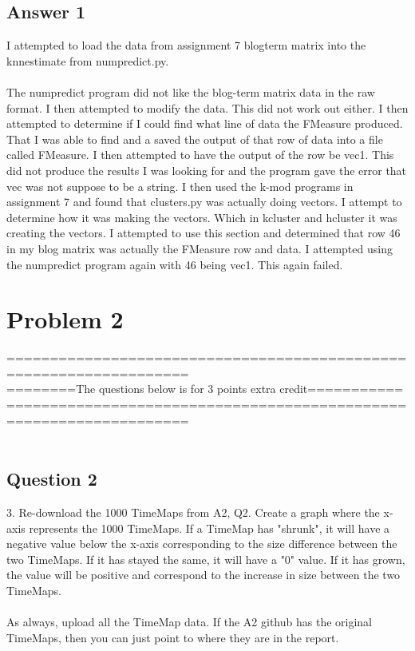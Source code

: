 \documentclass[10pt,letterpaper]{article}
\begin{document}
\subsection{Answer 1}

I attempted to load the data from assignment 7 blog\-term matrix into the knnestimate from numpredict.py.\\
\\
The numpredict program did not like the blog-term matrix data in the raw format.  I then attempted to modify the data.  This did not work out either.  I then attempted to determine if I could find what line of data the F\-Measure produced.  That I was able to find and a saved the output of that row of data into a file called F\-Measure.  I then attempted to have the output of the row be vec1.  This did not produce the results I was looking for and the program gave the error that vec was not suppose to be a string. I then used the k-mod programs in assignment 7 and found that clusters.py was actually doing vectors.  I attempt to determine how it was making the vectors.  Which in kcluster and hcluster it was creating the vectors.  I attempted to use this section and determined that row 46 in my blog matrix was actually the F\-Measure row and data.  I attempted using the numpredict program again with 46 being vec1.  This again failed.
\\
\pagebreak 
\section{Problem 2}
===================================================================\\
========The questions below is for 3 points extra credit===========\\
===================================================================\\
\\
\subsection{Question 2}
3. Re-download the 1000 TimeMaps from A2, Q2.  Create a graph where the x-axis represents the 1000 TimeMaps.  If a TimeMap has "shrunk", it will have a negative value below the x-axis corresponding to the size difference between the two TimeMaps.  If it has stayed the same, it will have a "0" value.  If it has grown, the value will be positive and correspond to the increase in size between the two TimeMaps.\\
\\
As always, upload all the TimeMap data.  If the A2 github has the original TimeMaps, then you can just point to where they are in the report.\\
\end{document}
